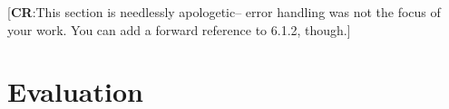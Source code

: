 \documentclass[nofilelist]{cslthse-msc}
\newcommand{\CR}[1]{\textcolor{green!60!black}{[\textbf{CR}:#1]}}
\begin{document}
\CR{This section is needlessly apologetic-- error handling was not the focus of your work.  You can add a forward reference to 6.1.2, though.}

%
%
%

%


\chapter{Evaluation} %
\end{document}
